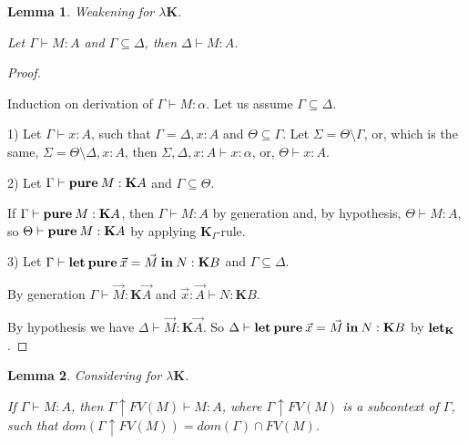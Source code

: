 \documentclass[a4paper]{article}
\newtheorem{lemma}{Lemma}
\begin{document}
  \begin{lemma} Weakening for $\lambda \textbf{K}$.

  Let $\Gamma \vdash M : A$ and $\Gamma \subseteq \Delta$, then $\Delta \vdash M : A$.

  \end{lemma}

  \begin{proof}

  $ $

  Induction on derivation of $\Gamma \vdash M : \alpha$. Let us assume $\Gamma \subseteq \Delta$.

  1) Let $\Gamma \vdash x : A$, such that $\Gamma = \Delta, x : A$ and $\Theta \subseteq \Gamma$.
  Let $\Sigma = \Theta \setminus \Gamma$, or, which is the same, $\Sigma = \Theta \setminus \Delta, x :
  A$, then $\Sigma, \Delta, x : A \vdash x : \alpha$, or, $\Theta \vdash x : A$.

  2) Let $\Gamma \vdash {\bf pure \: } M : \textbf{K}A$ and $\Gamma \subseteq \Theta$.

  If $\Gamma \vdash {\bf pure \: } M : \textbf{K}A$, then $\Gamma \vdash M : A$ by generation and, by
  hypothesis, $\Theta \vdash M : A$, so $\Theta \vdash {\bf pure \: } M : \textbf{K}A$ by applying
  $\textbf{K}_I$-rule.

  3) Let $\Gamma \vdash {\bf let \: pure \:} \vec{x} = \vec{M} {\bf \: in \:} N : \textbf{K}B$ and $\Gamma \subseteq \Delta$.

  By generation $\Gamma \vdash \vec{M} : \textbf{K}\vec{A}$ and $\vec{x} : \vec{A} \vdash N : \textbf{K}B$.

  By hypothesis we have $\Delta \vdash \vec{M} : \textbf{K}\vec{A}$. So $\Delta \vdash {\bf let \: pure \:} \vec{x} = \vec{M} {\bf \: in \:} N : \textbf{K}B$ by ${\bf let}_{\textbf{K}}$.

  \end{proof}

  \begin{lemma} Considering for $\lambda \textbf{K}$.

  If $\Gamma \vdash M : A$, then $\Gamma \uparrow FV(M) \vdash M : A$, where $\Gamma \uparrow
  FV(M)$ is a subcontext of $\Gamma$, such that $dom(\Gamma \uparrow FV(M)) = dom(\Gamma) \cap FV(M)$.

  \end{lemma}
\end{document}
